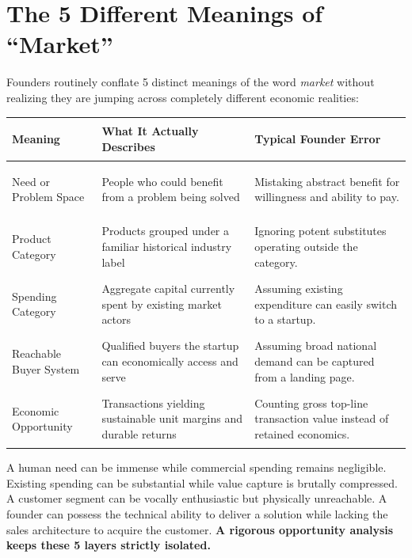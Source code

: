 \section{The 5 Different Meanings of ``Market''}

Founders routinely conflate 5 distinct meanings of the word \textit{market} without realizing they are jumping across completely different economic realities:

\begin{tcolorbox}[
  enhanced,
  colback=BayesSurface!60,
  colframe=BayesBorder,
  boxrule=0.5pt,
  arc=3pt,
  left=3pt,right=3pt,top=3pt,bottom=3pt,
  boxsep=1pt
]
\scriptsize
\begin{tabularx}{\linewidth}{>{\bfseries\raggedright\arraybackslash}p{1.8cm} >{\raggedright\arraybackslash}p{2.3cm} X}
\toprule
\textbf{Meaning} & \textbf{What It Actually Describes} & \textbf{Typical Founder Error} \\
\midrule
Need or Problem Space & People who could benefit from a problem being solved & Mistaking abstract benefit for willingness and ability to pay. \\
\addlinespace[2pt]
Product Category & Products grouped under a familiar historical industry label & Ignoring potent substitutes operating outside the category. \\
\addlinespace[2pt]
Spending Category & Aggregate capital currently spent by existing market actors & Assuming existing expenditure can easily switch to a startup. \\
\addlinespace[2pt]
Reachable Buyer System & Qualified buyers the startup can economically access and serve & Assuming broad national demand can be captured from a landing page. \\
\addlinespace[2pt]
Economic Opportunity & Transactions yielding sustainable unit margins and durable returns & Counting gross top-line transaction value instead of retained economics. \\
\bottomrule
\end{tabularx}
\end{tcolorbox}

A human need can be immense while commercial spending remains negligible. Existing spending can be substantial while value capture is brutally compressed. A customer segment can be vocally enthusiastic but physically unreachable. A founder can possess the technical ability to deliver a solution while lacking the sales architecture to acquire the customer. \textbf{A rigorous opportunity analysis keeps these 5 layers strictly isolated.}


